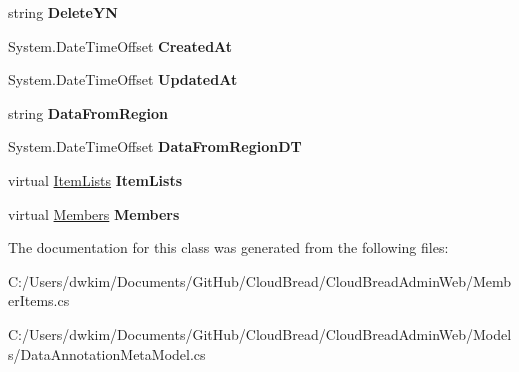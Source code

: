 \begin{DoxyCompactItemize}
\item 
string {\bfseries Delete\+YN}\hypertarget{a00143_acc0b5b46de8bc3a818b9c883b11f36c4}{}\label{a00143_acc0b5b46de8bc3a818b9c883b11f36c4}

\item 
System.\+Date\+Time\+Offset {\bfseries Created\+At}\hypertarget{a00143_a5d94750cce5420165cc8146b6666b413}{}\label{a00143_a5d94750cce5420165cc8146b6666b413}

\item 
System.\+Date\+Time\+Offset {\bfseries Updated\+At}\hypertarget{a00143_a01546fb8995a666ad0bbd0fe911b0088}{}\label{a00143_a01546fb8995a666ad0bbd0fe911b0088}

\item 
string {\bfseries Data\+From\+Region}\hypertarget{a00143_a7b0db173fa9c09d5f313f4405408c765}{}\label{a00143_a7b0db173fa9c09d5f313f4405408c765}

\item 
System.\+Date\+Time\+Offset {\bfseries Data\+From\+Region\+DT}\hypertarget{a00143_a041f3c91fb3ec279849e23ec7d773fd8}{}\label{a00143_a041f3c91fb3ec279849e23ec7d773fd8}

\item 
virtual \hyperlink{a00127}{Item\+Lists} {\bfseries Item\+Lists}\hypertarget{a00143_a017771c56a3c232e0cbcf74979460808}{}\label{a00143_a017771c56a3c232e0cbcf74979460808}

\item 
virtual \hyperlink{a00145}{Members} {\bfseries Members}\hypertarget{a00143_a6b8658b26d732c25cb45a76443c12523}{}\label{a00143_a6b8658b26d732c25cb45a76443c12523}

\end{DoxyCompactItemize}


The documentation for this class was generated from the following files\+:\begin{DoxyCompactItemize}
\item 
C\+:/\+Users/dwkim/\+Documents/\+Git\+Hub/\+Cloud\+Bread/\+Cloud\+Bread\+Admin\+Web/Member\+Items.\+cs\item 
C\+:/\+Users/dwkim/\+Documents/\+Git\+Hub/\+Cloud\+Bread/\+Cloud\+Bread\+Admin\+Web/\+Models/Data\+Annotation\+Meta\+Model.\+cs\end{DoxyCompactItemize}
